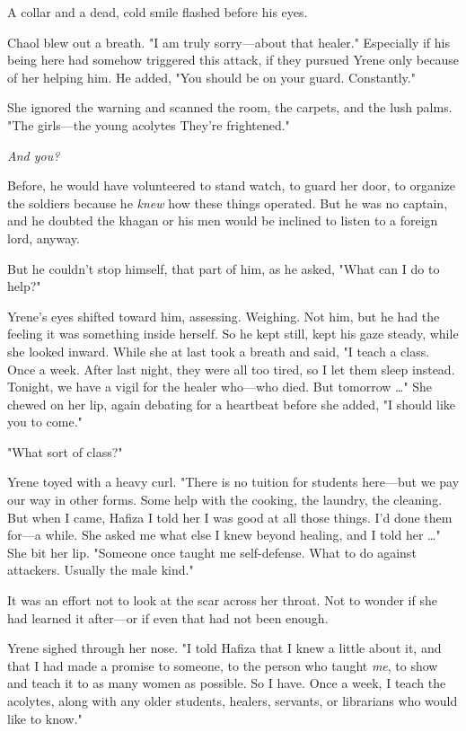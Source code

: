 A collar and a dead, cold smile flashed before his eyes.

Chaol blew out a breath. "I am truly sorry---about that healer." Especially if his being here had somehow triggered this attack, if they pursued Yrene only because of her helping him. He added, "You should be on your guard. Constantly."

She ignored the warning and scanned the room, the carpets, and the lush palms. "The girls---the young acolytes  They're frightened."

\emph{And you?}

Before, he would have volunteered to stand watch, to guard her door, to organize the soldiers because he \emph{knew} how these things operated. But he was no captain, and he doubted the khagan or his men would be inclined to listen to a foreign lord, anyway.

But he couldn't stop himself, that part of him, as he asked, "What can I do to help?"

Yrene's eyes shifted toward him, assessing. Weighing. Not him, but he had the feeling it was something inside herself. So he kept still, kept his gaze steady, while she looked inward. While she at last took a breath and said, "I teach a class. Once a week. After last night, they were all too tired, so I let them sleep instead. Tonight, we have a vigil for the healer who---who died. But tomorrow \ldots" She chewed on her lip, again debating for a heartbeat before she added, "I should like you to come."

"What sort of class?"

Yrene toyed with a heavy curl. "There is no tuition for students here---but we pay our way in other forms. Some help with the cooking, the laundry, the cleaning. But when I came, Hafiza  I told her I was good at all those things. I'd done them for---a while. She asked me what else I knew beyond healing, and I told her \ldots" She bit her lip. "Someone once taught me self-defense. What to do against attackers. Usually the male kind."

It was an effort not to look at the scar across her throat. Not to wonder if she had learned it after---or if even that had not been enough.

Yrene sighed through her nose. "I told Hafiza that I knew a little about it, and that  I had made a promise to someone, to the person who taught \emph{me}, to show and teach it to as many women as possible. So I have. Once a week, I teach the acolytes, along with any older students, healers, servants, or librarians who would like to know."

